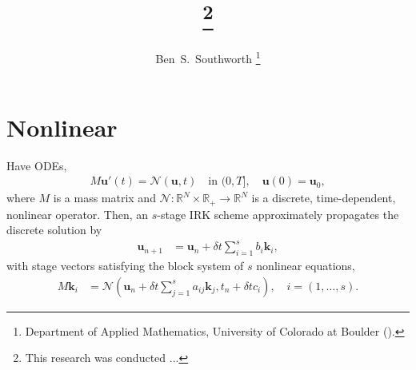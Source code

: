 \documentclass[review]{siamart}
\title{{\TheTitle}\thanks{This research was conducted ...
  }}
\author{%
  Ben~S.~Southworth
  \thanks{Department of Applied Mathematics,
          University of Colorado at Boulder
          (\email{ben.s.southworth@gmail.com}).}
}
\begin{document}
\allowdisplaybreaks


\newpage
\newpage
\section{Nonlinear}
Have ODEs,
%
\begin{align}
	M\mathbf{u}'(t) =  \mathcal{N}(\mathbf{u},t) \quad\text{in }(0,T], \quad \mathbf{u}(0) = \mathbf{u}_0,
\end{align}
%
where $M$ is a mass matrix and $\mathcal{N} \colon \mathbb{R}^{N} \times \mathbb{R}_+ \to \mathbb{R}^{N}$ is a discrete, time-dependent, nonlinear operator. Then, an $s$-stage IRK scheme approximately propagates the discrete  solution by
%
\begin{align}
\mathbf{u}_{n+1} & = \mathbf{u}_n + \delta t \sum_{i=1}^s b_i\mathbf{k}_i,
\end{align}
with stage vectors satisfying the block system of $s$ nonlinear equations,
\begin{align}
M\mathbf{k}_i & = \mathcal{N}\left(\mathbf{u}_n + \delta t\sum_{j=1}^s a_{ij}\mathbf{k}_j, t_n+\delta tc_i\right), \quad i = (1,\ldots,s).
\end{align}
\end{document}
